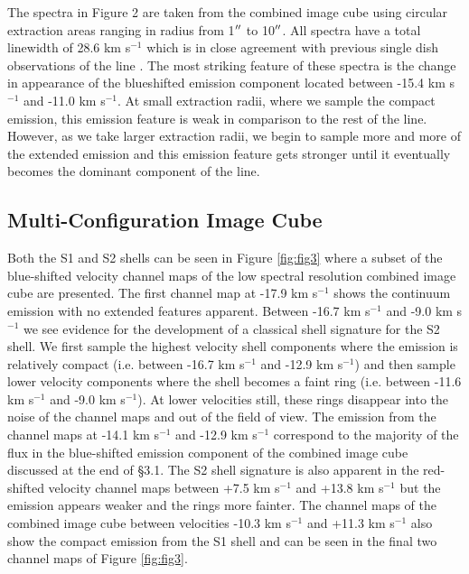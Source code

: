 \documentclass[preprint2]{aastex}
\begin{document}
The spectra in Figure 2 are taken from the combined image cube using circular extraction areas ranging in radius from 1$\mbox{$^{\prime\prime}$}$ to 10$\mbox{$^{\prime\prime}$}$. All spectra have a total linewidth of 28.6 km s${}^{-1}$ which is in close agreement with previous single dish observations of the line \citep{1980ApJ...242L..25K, 1987ApJ...313..400H, 1994ApJ...424L.127H}. The most striking feature of these spectra is the change in appearance of the blueshifted emission component located between -15.4 km s${}^{-1}$ and -11.0 km s${}^{-1}$.  At small extraction radii, where we sample the compact emission, this emission feature is weak in comparison to the rest of the line. However, as we take larger extraction radii, we begin to sample more and more of the extended emission and this emission feature gets stronger until it eventually becomes the dominant component of the line.

\subsection{Multi-Configuration Image Cube} \label{results2} 

Both the S1 and S2 shells can be seen in Figure \ref{fig:fig3} where a subset of the blue-shifted velocity channel maps of the low spectral resolution combined image cube are presented. The first channel map at -17.9 km s${}^{-1}$ shows the continuum emission with no extended features apparent. Between -16.7 km s${}^{-1}$ and -9.0 km s${}^{-1}$ we see evidence for the development of a classical shell signature for the S2 shell. We first sample the highest velocity shell components where the emission is relatively compact (i.e. between -16.7 km s${}^{-1}$ and -12.9 km s${}^{-1}$) and then sample lower velocity components where the shell becomes a faint ring (i.e. between -11.6 km s${}^{-1}$ and -9.0 km s${}^{-1}$). At lower velocities still, these rings disappear into the noise of the channel maps and out of the field of view. The emission from the channel maps at -14.1 km s${}^{-1}$ and -12.9 km s${}^{-1}$ correspond to the majority of the flux in the blue-shifted emission component of the combined image cube discussed at the end of \S3.1. The S2 shell signature is also apparent in the red-shifted velocity channel maps between +7.5 km s${}^{-1}$ and +13.8 km s${}^{-1}$ but the emission appears weaker and the rings more fainter. The channel maps of the combined image cube between velocities -10.3 km s${}^{-1}$ and +11.3 km s${}^{-1}$ also show the compact emission from the S1 shell and can be seen in the final two channel maps of Figure \ref{fig:fig3}. 
\end{document}
